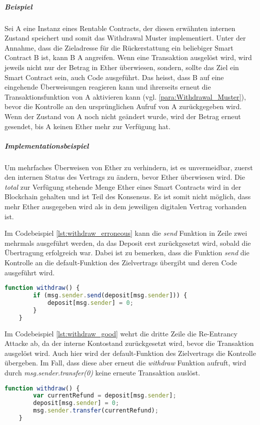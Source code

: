 \subparagraph{Beispiel}
Sei A eine Instanz eines Rentable Contracts, der diesen erwähnten internen Zustand speichert und somit das Withdrawal Muster implementiert. Unter der Annahme, dass die Zieladresse für die Rückerstattung ein beliebiger Smart Contract B ist, kann B A angreifen. Wenn eine Transaktion ausgelöst wird, wird jeweils nicht nur der Betrag in Ether überwiesen, sondern, sollte das Ziel ein Smart Contract sein, auch Code ausgeführt. Das heisst, dass B auf eine eingehende Überweisungen reagieren kann und ihrerseits erneut die Transaktionsfunktion von A aktivieren kann (vgl. \ref{para:Withdrawal_Muster}), bevor die Kontrolle an den ursprünglichen Aufruf von A zurückgegeben wird. Wenn der Zustand von A noch nicht geändert wurde, wird der Betrag erneut gesendet, bis A keinen Ether mehr zur Verfügung hat.

\subparagraph{Implementationsbeispiel}
Um mehrfaches Überweisen von Ether zu verhindern, ist es unvermeidbar, zuerst den internen Status des Vertrags zu ändern, bevor Ether überwiesen wird. Die \emph{total} zur Verfügung stehende Menge Ether eines Smart Contracts wird in der Blockchain gehalten und ist Teil des Konsensus. Es ist somit nicht möglich, dass mehr Ether ausgegeben wird als in dem jeweiligen digitalen Vertrag vorhanden ist.

Im Codebeispiel \ref{lst:withdraw_erroneous} kann die \emph{send} Funktion in Zeile zwei mehrmals ausgeführt werden, da das Deposit erst zurückgesetzt wird, sobald die Übertragung erfolgreich war. Dabei ist zu bemerken, dass die Funktion \emph{send} die Kontrolle an die default-Funktion des Zielvertrags übergibt und deren Code ausgeführt wird.\cite[FAQ/What's up with...]{solidity.readthedocs.io}
\begin{lstlisting}[language=javascript,caption={fehlerhaftes Code Snippet \protected{\cite[Common Patterns/Withdrawal From Contrats]{solidity.readthedocs.io}}},label={lst:withdraw_erroneous}]
    function withdraw() {
        if (msg.sender.send(deposit[msg.sender])) {
            deposit[msg.sender] = 0;
        }
    }
\end{lstlisting}

Im Codebeispiel \ref{lst:withdraw_good} wehrt die dritte Zeile die Re-Entrancy Attacke ab, da der interne Kontostand zurückgesetzt wird, bevor die Transaktion ausgelöst wird. Auch hier wird der default-Funktion des Zielvertrags die Kontrolle übergeben. Im Fall, dass diese aber erneut die \emph{withdraw} Funktion aufruft, wird durch \emph{msg.sender.transfer(0)} keine erneute Transaktion auslöst.
\begin{lstlisting}[language=javascript,caption={empfohlenes Code Snippet \protected{\cite[Common Patterns/Withdrawal From Contrats]{solidity.readthedocs.io}}},label={lst:withdraw_good}]
    function withdraw() {
        var currentRefund = deposit[msg.sender];
        deposit[msg.sender] = 0;
        msg.sender.transfer(currentRefund);
    }
\end{lstlisting}

